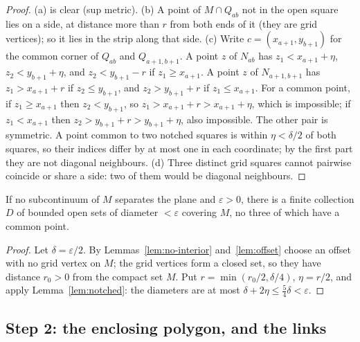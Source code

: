 \begin{proof}
(a) is clear (sup metric). (b) A point of $M\cap Q_{ab}$ not in the open square lies on a side, at
distance more than $r$ from both ends of it (they are grid vertices); so it lies in the strip along
that side. (c) Write $c=(x_{a+1},y_{b+1})$ for the common corner of $Q_{ab}$ and $Q_{a+1,b+1}$. A
point $z$ of $N_{ab}$ has $z_1<x_{a+1}+\eta$, $z_2<y_{b+1}+\eta$, and $z_2<y_{b+1}-r$ if $z_1\ge x_{a+1}$. A
point $z$ of $N_{a+1,b+1}$ has $z_1>x_{a+1}+r$ if $z_2\le y_{b+1}$, and $z_2>y_{b+1}+r$ if $z_1\le x_{a+1}$.
For a common point, if $z_1\ge x_{a+1}$ then $z_2<y_{b+1}$, so $z_1>x_{a+1}+r>x_{a+1}+\eta$, which is
impossible; if $z_1<x_{a+1}$ then $z_2>y_{b+1}+r>y_{b+1}+\eta$, also impossible. The other pair is
symmetric. A point common to two notched squares is within $\eta<\delta/2$ of both squares,
so their indices differ by at most one in each coordinate; by the first part they are not diagonal
neighbours. (d) Three distinct grid squares cannot pairwise coincide or share a side: two of them would
be diagonal neighbours.
\end{proof}


\begin{corollary}\label{cor:notched-cover}
If no subcontinuum of $M$ separates the plane and $\varepsilon>0$, there is a finite collection $D$ of
bounded open sets of diameter $<\varepsilon$ covering $M$, no three of which have a common point.
\end{corollary}

\begin{proof}
Let $\delta=\varepsilon/2$. By Lemmas~\ref{lem:no-interior} and~\ref{lem:offset} choose an offset with
no grid vertex on $M$; the grid vertices form a closed set, so they have distance $r_0>0$ from the
compact set $M$. Put $r=\min(r_0/2,\delta/4)$, $\eta=r/2$, and apply Lemma~\ref{lem:notched}: the
diameters are at most $\delta+2\eta\le\frac54\delta<\varepsilon$.
\end{proof}


\subsection*{Step 2: the enclosing polygon, and the links}

